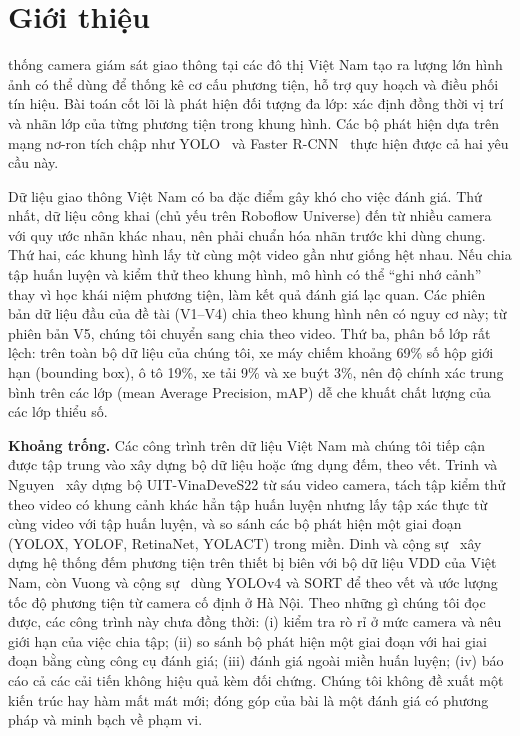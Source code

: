 \documentclass[10pt,journal,a4paper]{IEEEtran}
\begin{document}
\section{Giới thiệu}
 thống camera giám sát giao thông tại các đô thị Việt Nam tạo ra lượng lớn hình ảnh có thể dùng để thống kê cơ cấu phương tiện, hỗ trợ quy hoạch và điều phối tín hiệu. Bài toán cốt lõi là phát hiện đối tượng đa lớp: xác định đồng thời vị trí và nhãn lớp của từng phương tiện trong khung hình. Các bộ phát hiện dựa trên mạng nơ-ron tích chập như YOLO~\cite{yolo} và Faster R-CNN~\cite{frcnn} thực hiện được cả hai yêu cầu này.

Dữ liệu giao thông Việt Nam có ba đặc điểm gây khó cho việc đánh giá. Thứ nhất, dữ liệu công khai (chủ yếu trên Roboflow Universe) đến từ nhiều camera với quy ước nhãn khác nhau, nên phải chuẩn hóa nhãn trước khi dùng chung. Thứ hai, các khung hình lấy từ cùng một video gần như giống hệt nhau. Nếu chia tập huấn luyện và kiểm thử theo khung hình, mô hình có thể ``ghi nhớ cảnh'' thay vì học khái niệm phương tiện, làm kết quả đánh giá lạc quan. Các phiên bản dữ liệu đầu của đề tài (V1--V4) chia theo khung hình nên có nguy cơ này; từ phiên bản V5, chúng tôi chuyển sang chia theo video. Thứ ba, phân bố lớp rất lệch: trên toàn bộ dữ liệu của chúng tôi, xe máy chiếm khoảng 69\% số hộp giới hạn (bounding box), ô tô 19\%, xe tải 9\% và xe buýt 3\%, nên độ chính xác trung bình trên các lớp (mean Average Precision, mAP) dễ che khuất chất lượng của các lớp thiểu số.

\textbf{Khoảng trống.} Các công trình trên dữ liệu Việt Nam mà chúng tôi tiếp cận được tập trung vào xây dựng bộ dữ liệu hoặc ứng dụng đếm, theo vết. Trinh và Nguyen~\cite{trinh} xây dựng bộ UIT-VinaDeveS22 từ sáu video camera, tách tập kiểm thử theo video có khung cảnh khác hẳn tập huấn luyện nhưng lấy tập xác thực từ cùng video với tập huấn luyện, và so sánh các bộ phát hiện một giai đoạn (YOLOX, YOLOF, RetinaNet, YOLACT) trong miền. Dinh và cộng sự~\cite{dinh} xây dựng hệ thống đếm phương tiện trên thiết bị biên với bộ dữ liệu VDD của Việt Nam, còn Vuong và cộng sự~\cite{vuong} dùng YOLOv4 và SORT để theo vết và ước lượng tốc độ phương tiện từ camera cố định ở Hà Nội. Theo những gì chúng tôi đọc được, các công trình này chưa đồng thời: (i) kiểm tra rò rỉ ở mức camera và nêu giới hạn của việc chia tập; (ii) so sánh bộ phát hiện một giai đoạn với hai giai đoạn bằng cùng công cụ đánh giá; (iii) đánh giá ngoài miền huấn luyện; (iv) báo cáo cả các cải tiến không hiệu quả kèm đối chứng. Chúng tôi không đề xuất một kiến trúc hay hàm mất mát mới; đóng góp của bài là một đánh giá có phương pháp và minh bạch về phạm vi.
\end{document}
